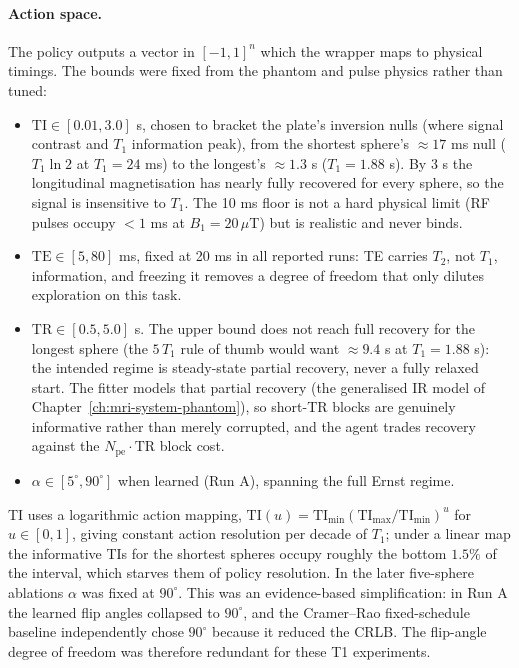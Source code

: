 \paragraph{Action space.} The policy outputs a vector in $[-1,1]^n$ which the
wrapper maps to physical timings. The bounds were fixed from the phantom and
pulse physics rather than tuned:
\begin{itemize}
\setlength{\itemsep}{1pt}
    \item $\mathrm{TI} \in [0.01, 3.0]$ s, chosen to bracket the plate's
    inversion nulls (where signal contrast and $T_1$ information peak), from
    the shortest sphere's ${\approx}17$ ms null ($T_1\ln 2$ at $T_1 = 24$ ms)
    to the longest's ${\approx}1.3$ s ($T_1 = 1.88$ s). By 3 s the longitudinal
    magnetisation has nearly fully recovered for every sphere, so the signal is
    insensitive to $T_1$. The 10 ms
    floor is not a hard physical limit (RF pulses occupy ${<}1$ ms at
    $B_1 = 20\,\mu$T) but is realistic and never binds.
    \item $\mathrm{TE} \in [5, 80]$ ms, fixed at 20 ms in all reported runs:
    TE carries $T_2$, not $T_1$, information, and freezing it removes a
    degree of freedom that only dilutes exploration on this task.
    \item $\mathrm{TR} \in [0.5, 5.0]$ s. The upper bound does not reach full
    recovery for the longest sphere (the $5\,T_1$ rule of thumb would want
    ${\approx}9.4$ s at $T_1 = 1.88$ s): the intended regime is steady-state
    partial recovery, never a fully relaxed start. The fitter models that
    partial recovery (the generalised IR model of
    Chapter~\ref{ch:mri-system-phantom}), so short-TR blocks are genuinely
    informative rather than merely corrupted, and the agent trades recovery
    against the $N_\mathrm{pe}\cdot\mathrm{TR}$ block cost.
    \item $\alpha \in [5^\circ, 90^\circ]$ when learned (Run A), spanning the
    full Ernst regime.
\end{itemize}
TI uses a logarithmic action mapping,
$\mathrm{TI}(u) = \mathrm{TI}_{\min}(\mathrm{TI}_{\max}/\mathrm{TI}_{\min})^{u}$
for $u\in[0,1]$, giving constant action resolution per decade of $T_1$; under
a linear map the informative TIs for the shortest spheres occupy roughly the
bottom $1.5\%$ of the interval, which starves them of policy resolution. In
the later five-sphere ablations $\alpha$ was fixed at $90^\circ$. This was an
evidence-based simplification: in Run A the learned flip angles collapsed to
$90^\circ$, and the Cramer--Rao fixed-schedule baseline independently chose
$90^\circ$ because it reduced the CRLB. The flip-angle degree of freedom was therefore redundant for these T1 experiments.

